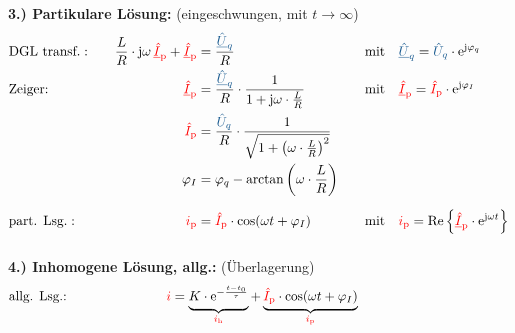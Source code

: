 {    \begin{frame}
        \textbf{3.) Partikulare Lösung:} (eingeschwungen, mit $t \to \infty$)%
        \begin{align*}%
                &\text{DGL transf.}:&&&
                \frac{L}{R} \cdot \mathrm{j}\omega\, \eci{\underline{\hat{I}}_{\mathrm p}} + \eci{\underline{\hat{I}}_{\mathrm p}} &= \frac{\ecv{\underline{\hat{U}}_q}}{R} &&&
                    &\text{mit}\quad \ecv{\underline{\hat{U}}_q}=\ecv{\hat{U}_q} \cdot \mathrm{e}^{\mathrm{j}\varphi_q}\\
                &\text{Zeiger:}&&&
                    \eci{\underline{\hat{I}}_{\mathrm p}} &= \frac{\ecv{\underline{\hat{U}}_q}}{R} \cdot \frac{1}{1 + \mathrm{j} \omega \cdot\frac{L}{R}} &&&
                    &\text{mit}\quad \eci{\underline{\hat{I}}_{\mathrm p}} = \eci{\hat{I}_{\mathrm p}}\cdot\mathrm{e}^{\mathrm{j}\varphi_I}\\
                &&&&
                    \eci{\hat{I}_{\mathrm p}} &=  \frac{\ecv{\hat{U}_q}}{R}\cdot\frac{1}{\sqrt{1 + \left(\omega \cdot\frac{L}{R}\right)^2}}\\
                &&&&
                    \varphi_I &= \varphi_q - \arctan\left(\omega \cdot\frac{L}{R}\right) \\
                &\text{part. Lsg.}:&&&
                    \eci{i_{\mathrm p}} &= \eci{\hat{I}_{\mathrm p}} \cdot \cos(\omega t + \varphi_I) &&&
                    &\text{mit}\quad \eci{i_{\mathrm p}} = \Re\left\{\eci{\underline{\hat{I}}_{\mathrm p}} \cdot \mathrm{e}^{\mathrm{j}\omega t}\right\} \vphantom{\Bigg|}
        \end{align*}%
    \end{frame}

    \begin{frame}
        \textbf{4.) Inhomogene Lösung, allg.:} (Überlagerung)%
        \begin{align*}
            &\text{allg. Lsg.:}&&&
                \eci{i} &=
                \underbrace{ \vphantom{\big|}
                    K \cdot \mathrm{e}^{-\frac{t-t_0}{\tau}}
                }_{\eci{i_{\mathrm h}}}
                +
                \underbrace{ \vphantom{\big|}
                    \eci{\hat{I}_{\mathrm p}} \cdot \cos(\omega t + \varphi_I)
                }_{\eci{i_{\mathrm p}}}&&&
            \\[-15pt]&\hphantom{R1oooooooooo}&&&\hphantom{L3oooooo}&\hphantom{R3oooooooooooooooooooooooooooooooooooooooooooooo}\nonumber%
        \end{align*}%
        \pause%


\end{frame}}
